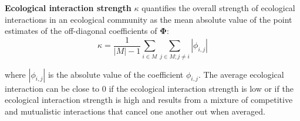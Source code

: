 \documentclass[letterpaper]{article}\usepackage[]{graphicx}\usepackage[]{color}
\begin{document}

\vspace{0.8em}
\noindent \textbf{Ecological interaction strength}
$\kappa$ quantifies the overall strength of ecological interactions in an ecological community as the mean absolute value of the point estimates of the off-diagonal coefficients of $\mathbf{\Phi}$:
\begin{equation}\label{eq:average.absolute.interaction}
\kappa = \frac{1}{\left|M\right| - 1} \sum_{i\in M} \sum_{j\in M;j\ne i} \left| \phi_{i,j} \right|
\end{equation}

\noindent where $\left| \phi_{i,j} \right|$ is the absolute value of the coefficient $\phi_{i,j}$.
The average ecological interaction can be close to 0 if the ecological interaction strength is low or if the ecological interaction strength is high and results from a mixture of competitive and mutualistic interactions that cancel one another out when averaged.





\end{document}
